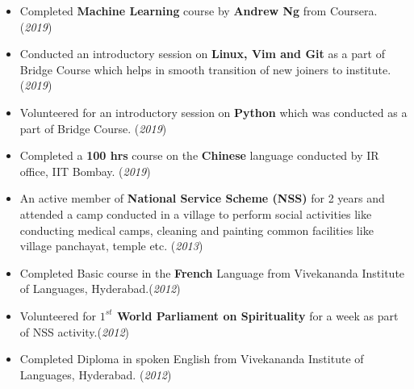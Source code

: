 \documentclass[10pt]{article}
\begin{document}
\begin{itemize}
	\item {Completed \textbf{Machine Learning} course by \textbf{Andrew Ng} from Coursera. }\hfill{(\textit{2019})}
	\item {Conducted an introductory session on \textbf{Linux, Vim and Git} as a part of Bridge Course which helps in smooth transition of new joiners to institute. }\hfill{(\textit{2019})}
	\item {Volunteered for an introductory session on \textbf{Python} which was conducted as a part of Bridge Course.}
	\hfill{(\textit{2019})}
    \item {Completed a \textbf{100 hrs} course on the \textbf{Chinese} language conducted by IR office, IIT Bombay. }\hfill{(\textit{2019})}
	\item {An active member of \textbf{National Service Scheme (NSS)} for 2 years and attended a camp conducted in a village to perform social activities like conducting medical camps, cleaning and painting common facilities like village panchayat, temple etc.} \hfill{(\textit{2013})}
    \item {Completed Basic course in the \textbf{French} Language from Vivekananda Institute of Languages, Hyderabad.}\hfill{(\textit{2012})}
   	\item {Volunteered for \textbf{$1^{st}$ World Parliament on Spirituality} for a week as part of NSS activity.}\hfill{(\textit{2012})}
	\item {Completed Diploma in spoken English from Vivekananda Institute of Languages, Hyderabad.} \hfill{(\textit{2012})}
    
    
\end{itemize}

\end{document}
